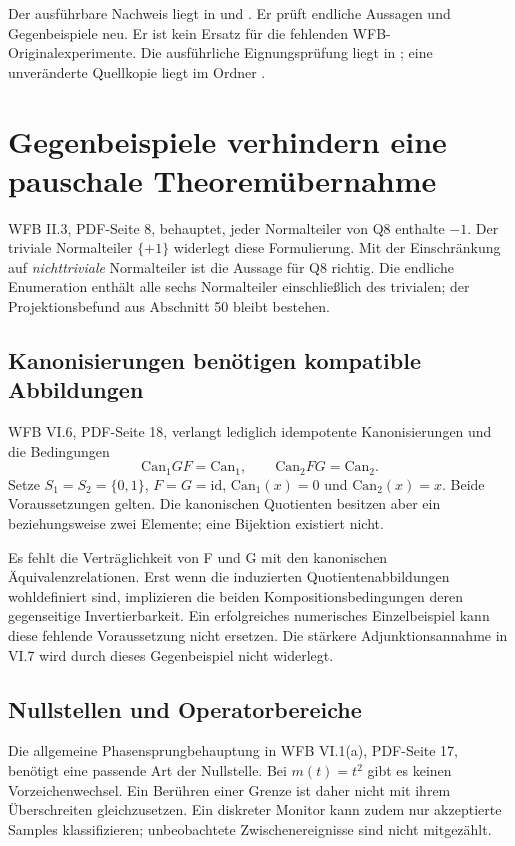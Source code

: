 \documentclass[11pt,a4paper]{article}
\newcommand{\nextsection}[2]{\clearpage{\color{accent}\small\textsf{#1}}\section{#2}}
\begin{document}
Der ausführbare Nachweis liegt in  und
. Er prüft endliche Aussagen und
Gegenbeispiele neu. Er ist kein Ersatz für die fehlenden
WFB-Originalexperimente. Die ausführliche Eignungsprüfung liegt
in ; eine unveränderte Quellkopie
liegt im Ordner .

\nextsection{51 / ÜBERNAHMEGRENZEN}{Gegenbeispiele verhindern eine pauschale Theoremübernahme}
WFB II.3, PDF-Seite 8, behauptet, jeder Normalteiler von Q8
enthalte $-1$. Der triviale Normalteiler $\{+1\}$ widerlegt diese
Formulierung. Mit der Einschränkung auf \emph{nichttriviale}
Normalteiler ist die Aussage für Q8 richtig. Die endliche
Enumeration enthält alle sechs Normalteiler einschließlich des
trivialen; der Projektionsbefund aus Abschnitt 50 bleibt bestehen.

\subsection{Kanonisierungen benötigen kompatible Abbildungen}
WFB VI.6, PDF-Seite 18, verlangt lediglich idempotente
Kanonisierungen und die Bedingungen
\[
 \mathrm{Can}_1GF=\mathrm{Can}_1,\qquad
 \mathrm{Can}_2FG=\mathrm{Can}_2.
\]
Setze $S_1=S_2=\{0,1\}$, $F=G=\mathrm{id}$,
$\mathrm{Can}_1(x)=0$ und $\mathrm{Can}_2(x)=x$.
Beide Voraussetzungen gelten. Die kanonischen Quotienten
besitzen aber ein beziehungsweise zwei Elemente; eine
Bijektion existiert nicht.

Es fehlt die Verträglichkeit von F und G mit den kanonischen
Äquivalenzrelationen. Erst wenn die induzierten Quotientenabbildungen
wohldefiniert sind, implizieren die beiden Kompositionsbedingungen
deren gegenseitige Invertierbarkeit. Ein erfolgreiches numerisches
Einzelbeispiel kann diese fehlende Voraussetzung nicht ersetzen.
Die stärkere Adjunktionsannahme in VI.7 wird durch dieses
Gegenbeispiel nicht widerlegt.

\subsection{Nullstellen und Operatorbereiche}
Die allgemeine Phasensprungbehauptung in WFB VI.1(a), PDF-Seite 17,
benötigt eine passende Art der Nullstelle. Bei $m(t)=t^2$ gibt es
keinen Vorzeichenwechsel. Ein Berühren einer Grenze ist daher
nicht mit ihrem Überschreiten gleichzusetzen. Ein diskreter Monitor
kann zudem nur akzeptierte Samples klassifizieren; unbeobachtete
Zwischenereignisse sind nicht mitgezählt.
\end{document}
